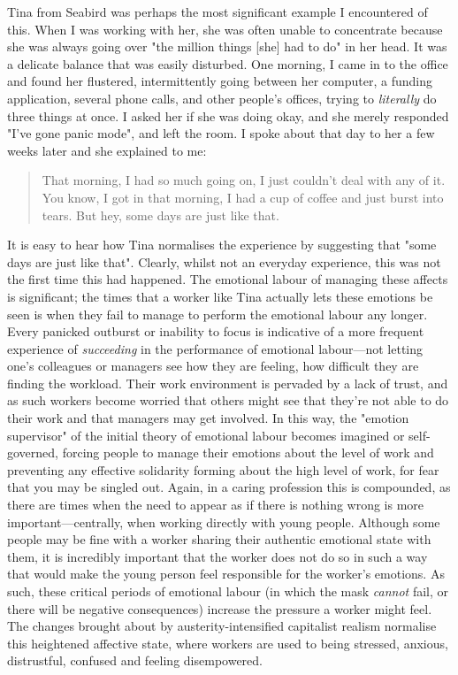 Tina from Seabird was perhaps the most significant example I encountered of this. When I was working with her, she was often unable to concentrate because she was always going over "the million things [she] had to do" in her head. It was a delicate balance that was easily disturbed. One morning, I came in to the office and found her flustered, intermittently going between her computer, a funding application, several phone calls, and other people's offices, trying to \emph{literally} do three things at once. I asked her if she was doing okay, and she merely responded "I've gone panic mode", and left the room. I spoke about that day to her a few weeks later and she explained to me: 
\begin{quote} 
That morning, I had so much going on, I just couldn't deal with any of it. You know, I got in that morning, I had a cup of coffee and just burst into tears. But hey, some days are just like that.
\end{quote}
It is easy to hear how Tina normalises the experience by suggesting that "some days are just like that". Clearly, whilst not an everyday experience, this was not the first time this had happened. The emotional labour of managing these affects is significant; the times that a worker like Tina actually lets these emotions be seen is when they fail to manage to perform the emotional labour any longer. Every panicked outburst or inability to focus is indicative of a more frequent experience of \emph{succeeding} in the performance of emotional labour—not letting one's colleagues or managers see how they are feeling, how difficult they are finding the workload. Their work environment is pervaded by a lack of trust, and as such workers become worried that others might see that they’re not able to do their work and that managers may get involved. In this way, the "emotion supervisor" of the initial theory of emotional labour becomes imagined or self-governed, forcing people to manage their emotions about the level of work and preventing any effective solidarity forming about the high level of work, for fear that you may be singled out. Again, in a caring profession this is compounded, as there are times when the need to appear as if there is nothing wrong is more important—centrally, when working directly with young people. Although some people may be fine with a worker sharing their authentic emotional state with them, it is incredibly important that the worker does not do so in such a way that would make the young person feel responsible for the worker's emotions. As such, these critical periods of emotional labour (in which the mask \emph{cannot} fail, or there will be negative consequences) increase the pressure a worker might feel. The changes brought about by austerity-intensified capitalist realism normalise this heightened affective state, where workers are used to being stressed, anxious, distrustful, confused and feeling disempowered.

